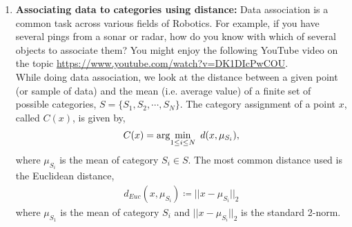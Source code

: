 \documentclass[letterpaper]{article}
\begin{document}
\begin{enumerate}
\begin{enumerate}
\begin{itemize}
        \item If you want the version with the Matrix Inversion Lemma, see the hints!

        \item Turn in a plot of $E_k :=||  \hat{x}_k  - x_k||$ versus $k$, and label your plot appropriately.
        To be clear, there are no $\lambda$'s in the computation of $E_k$; we are just using the standard Euclidean norm to see how well we are doing in tracking
        $x$ as it slowly drifts.

         \end{itemize}
\end{enumerate}

\item  \textbf{Associating data to categories using distance:} Data association is a common task across various fields of Robotics. For example, if you have several pings from a sonar or radar, how do you know with which of several objects to associate them? You might enjoy the following YouTube video on the topic \url{https://www.youtube.com/watch?v=DK1DIcPwCOU}. \\

While doing data association, we look at the distance between a given point (or sample of data) and the mean (i.e. average value) of a finite set of possible categories, $S=\{S_1, S_2, \cdots, S_N\}$. The category assignment of a point $x$, called $C(x)$, is given by,
\begin{align}
C(x) = \arg\!\min_{1 \le i \le N} ~ d (x, \mu_{S_i}),
\nonumber
\end{align}
where $\mu_{S_i}$ is the mean of category $S_i \in S$.
The most common distance used is the Euclidean distance,
\begin{align}
d_{Euc}(x, \mu_{S_i}) \coloneqq \vert\vert x - \mu_{S_i} \vert\vert_2
\nonumber
\end{align}
where $\mu_{S_1}$ is the mean of category $S_i$ and $\vert\vert x - \mu_{S_i} \vert\vert_2$ is the standard 2-norm.


\end{enumerate}
\end{document}
